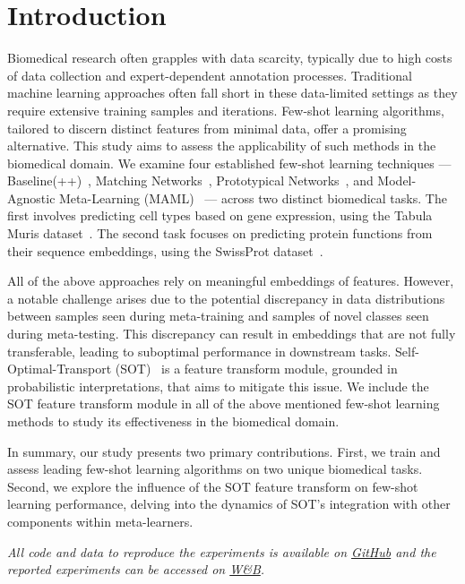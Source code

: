 \section{Introduction}

Biomedical research often grapples with data scarcity, typically due to high costs of data collection and expert-dependent annotation processes. Traditional machine learning approaches often fall short in these data-limited settings as they require extensive training samples and iterations. Few-shot learning algorithms, tailored to discern distinct features from minimal data, offer a promising alternative. This study aims to assess the applicability of such methods in the biomedical domain. We examine four established few-shot learning techniques — Baseline(++)~\cite{baseline}, Matching Networks~\cite{matchingnet}, Prototypical Networks~\cite{protonet}, and Model-Agnostic Meta-Learning (MAML)~\cite{maml} — across two distinct biomedical tasks. The first involves predicting cell types based on gene expression, using the Tabula Muris dataset~\cite{tabula2018}. The second task focuses on predicting protein functions from their sequence embeddings, using the SwissProt dataset~\cite{uniprot2019}.

All of the above approaches rely on meaningful embeddings of features. However, a notable challenge arises due to the potential discrepancy in data distributions between samples seen during meta-training and samples of novel classes seen during meta-testing. This discrepancy can result in embeddings that are not fully transferable, leading to suboptimal performance in downstream tasks. Self-Optimal-Transport (SOT)~\cite{sot} is a feature transform module, grounded in probabilistic interpretations, that aims to mitigate this issue. We include the SOT feature transform module in all of the above mentioned few-shot learning methods to study its effectiveness in the biomedical domain.

In summary, our study presents two primary contributions. First, we train and assess leading few-shot learning algorithms on two unique biomedical tasks. Second, we explore the influence of the SOT feature transform on few-shot learning performance, delving into the dynamics of SOT's integration with other components within meta-learners.

\textit{All code and data to reproduce the experiments is available on \href{https://github.com/mikasenghaas/few-shot-benchmark}{GitHub} and the reported experiments can be accessed on \href{https://wandb.ai/metameta-learners/few-shot-benchmark}{W\&B}.}